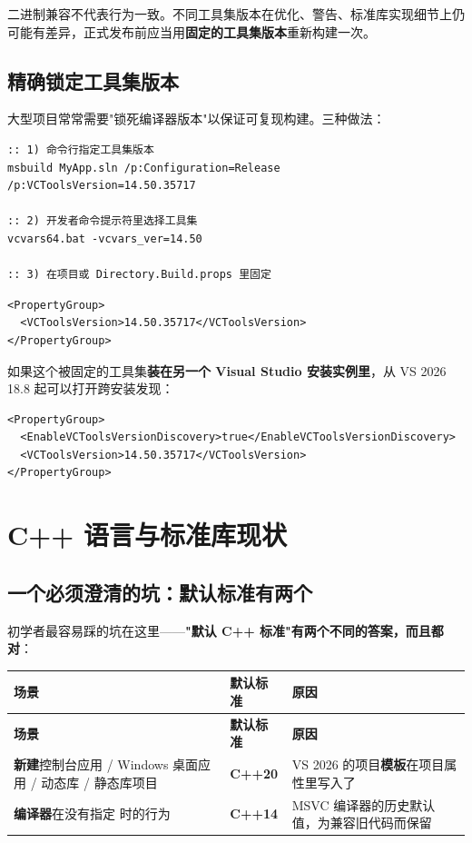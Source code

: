 \begin{warnbox}[注意]
二进制兼容不代表行为一致。不同工具集版本在优化、警告、标准库实现细节上仍可能有差异，正式发布前应当用\textbf{固定的工具集版本}重新构建一次。
\end{warnbox}

\subsection{精确锁定工具集版本}
大型项目常常需要"锁死编译器版本"以保证可复现构建。三种做法：

\begin{lstlisting}[style=shellstyle]
:: 1) 命令行指定工具集版本
msbuild MyApp.sln /p:Configuration=Release /p:VCToolsVersion=14.50.35717

:: 2) 开发者命令提示符里选择工具集
vcvars64.bat -vcvars_ver=14.50

:: 3) 在项目或 Directory.Build.props 里固定
\end{lstlisting}

\begin{lstlisting}[style=xmlstyle]
<PropertyGroup>
  <VCToolsVersion>14.50.35717</VCToolsVersion>
</PropertyGroup>
\end{lstlisting}

如果这个被固定的工具集\textbf{装在另一个 Visual Studio 安装实例里}，从 VS 2026 18.8 起可以打开跨安装发现：

\begin{lstlisting}[style=xmlstyle]
<PropertyGroup>
  <EnableVCToolsVersionDiscovery>true</EnableVCToolsVersionDiscovery>
  <VCToolsVersion>14.50.35717</VCToolsVersion>
</PropertyGroup>
\end{lstlisting}

\section{C++ 语言与标准库现状}
\subsection{一个必须澄清的坑：默认标准有两个}
初学者最容易踩的坑在这里——\textbf{"默认 C++ 标准"有两个不同的答案，而且都对}：

\begin{longtable}{L{6.8cm}C{2.0cm}L{5.8cm}}
\toprule
\textbf{场景} & \textbf{默认标准} & \textbf{原因} \\
\midrule
\endfirsthead
\toprule
\textbf{场景} & \textbf{默认标准} & \textbf{原因} \\
\midrule
\endhead
\bottomrule
\endlastfoot
\textbf{新建}控制台应用 / Windows 桌面应用 / 动态库 / 静态库项目 & \textbf{C++20} & VS 2026 的项目\textbf{模板}在项目属性里写入了  \\
\textbf{编译器}在没有指定  时的行为 & \textbf{C++14} & MSVC 编译器的历史默认值，为兼容旧代码而保留 \\
\end{longtable}

